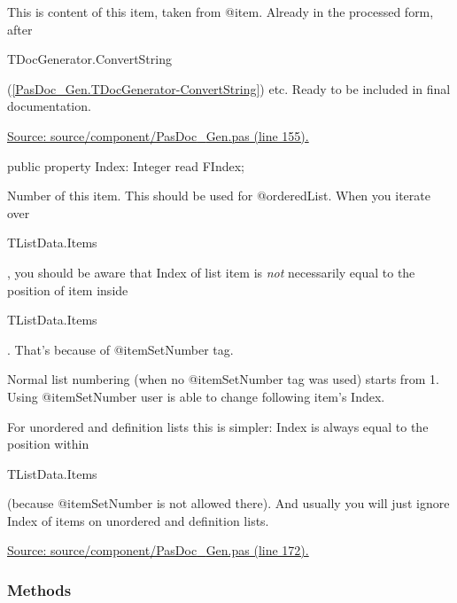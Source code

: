 \documentclass{report}
\newif\ifpdf
\begin{document}
\begin{list}{}
\par This is content of this item, taken from @item. Already in the processed form, after \begin{ttfamily}TDocGenerator.ConvertString\end{ttfamily}(\ref{PasDoc_Gen.TDocGenerator-ConvertString}) etc. Ready to be included in final documentation.\par
\href{https://github.com/pasdoc/pasdoc/blob/master/source/component/PasDoc_Gen.pas#L155}{Source: source/component/PasDoc{\_}Gen.pas (line 155).}\label{PasDoc_Gen.TListItemData-Index}
\item[\textbf{Index}\hfill]
\ifpdf
\begin{flushleft}
\fi
\begin{ttfamily}
public property Index: Integer read FIndex;\end{ttfamily}

\ifpdf
\end{flushleft}
\fi


\par Number of this item. This should be used for @orderedList. When you iterate over \begin{ttfamily}TListData.Items\end{ttfamily}, you should be aware that Index of list item is \textit{not} necessarily equal to the position of item inside \begin{ttfamily}TListData.Items\end{ttfamily}. That's because of @itemSetNumber tag.

Normal list numbering (when no @itemSetNumber tag was used) starts from 1. Using @itemSetNumber user is able to change following item's Index.

For unordered and definition lists this is simpler: Index is always equal to the position within \begin{ttfamily}TListData.Items\end{ttfamily} (because @itemSetNumber is not allowed there). And usually you will just ignore Index of items on unordered and definition lists.\par
\href{https://github.com/pasdoc/pasdoc/blob/master/source/component/PasDoc_Gen.pas#L172}{Source: source/component/PasDoc{\_}Gen.pas (line 172).}\end{list}
\subsubsection*{\large{\textbf{Methods}}\normalsize\hspace{1ex}\hfill}
\end{document}

